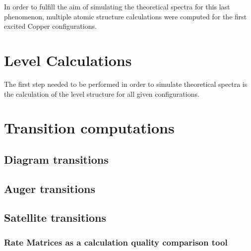 In order to fulfill the aim of simulating the theoretical spectra for this last phenomenon, multiple atomic structure calculations were computed for the first excited Copper configurations.


\section{Level Calculations}

The first step needed to be performed in order to simulate theoretical spectra is the calculation of the level structure for all given configurations.
\section{Transition computations}
\subsection{Diagram transitions}
\subsection{Auger transitions}
\subsection{Satellite transitions}

\subsubsection{Rate Matrices as a calculation quality comparison tool}

